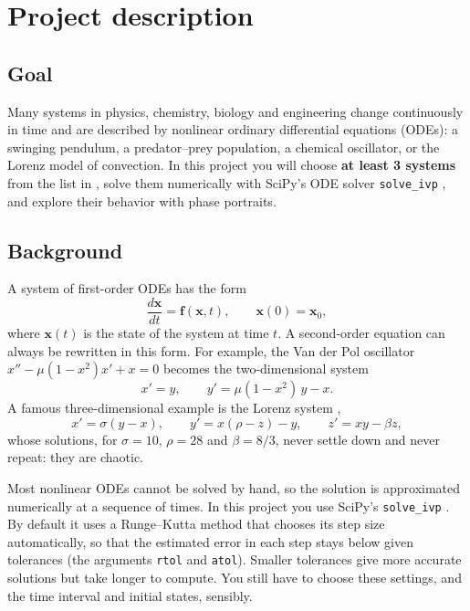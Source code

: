 \documentclass[11pt,a4paper]{article}
\begin{document}
\section*{Project description}

\subsection*{Goal}
Many systems in physics, chemistry, biology and engineering change
continuously in time and are described by nonlinear ordinary differential
equations (ODEs): a swinging pendulum, a predator--prey population, a chemical
oscillator, or the Lorenz model of convection. In this project you will choose
\textbf{at least 3 systems} from the list in \cite{list}, solve them
numerically with SciPy's ODE solver \texttt{solve\_ivp} \cite{scipy}, and
explore their behavior with phase portraits.

\subsection*{Background}
A system of first-order ODEs has the form
\begin{equation*}
  \frac{d\mathbf{x}}{dt} = \mathbf{f}(\mathbf{x}, t), \qquad
  \mathbf{x}(0) = \mathbf{x}_0,
\end{equation*}
where $\mathbf{x}(t)$ is the state of the system at time $t$. A second-order
equation can always be rewritten in this form. For example, the Van der Pol
oscillator $x'' - \mu(1 - x^2)x' + x = 0$ becomes the two-dimensional system
\begin{equation*}
  x' = y, \qquad y' = \mu(1 - x^2)\,y - x .
\end{equation*}
A famous three-dimensional example is the Lorenz system \cite{lorenz},
\begin{equation*}
  x' = \sigma(y - x), \qquad y' = x(\rho - z) - y, \qquad z' = xy - \beta z,
\end{equation*}
whose solutions, for $\sigma = 10$, $\rho = 28$ and $\beta = 8/3$, never settle
down and never repeat: they are chaotic.

Most nonlinear ODEs cannot be solved by hand, so the solution is approximated
numerically at a sequence of times. In this project you use SciPy's
\texttt{solve\_ivp} \cite{scipy}. By default it uses a Runge--Kutta method
that chooses its step size automatically, so that the estimated error in each
step stays below given tolerances (the arguments \texttt{rtol} and
\texttt{atol}). Smaller tolerances give more accurate solutions but take
longer to compute. You still have to choose these settings, and the time
interval and initial states, sensibly.
\end{document}
